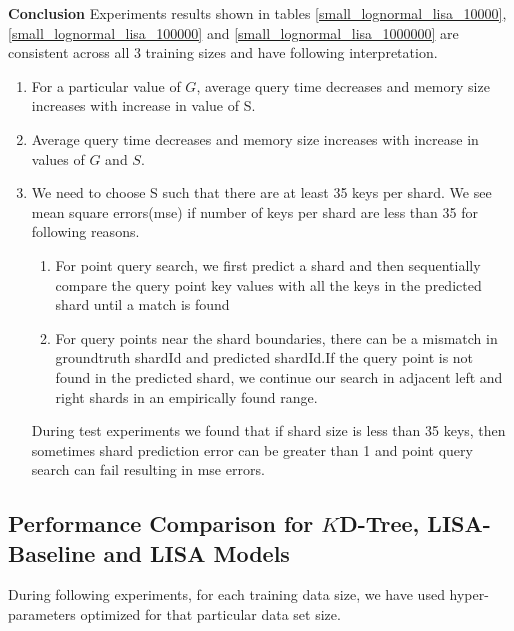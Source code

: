 \textbf{Conclusion} Experiments results shown in tables \ref{small_lognormal_lisa_10000}, \ref{small_lognormal_lisa_100000} and \ref{small_lognormal_lisa_1000000} are consistent across all 3 training sizes and have following interpretation. 
\begin{enumerate}

    \item For a particular value of $G$, average query time decreases and memory size increases with increase in value of S.
    
    \item Average query time decreases and memory size increases with increase in values of $G$ and $S$. 
	
	\item We need to choose S such that there are at least 35 keys per shard. We see mean square errors(mse) if number of keys per shard are less than 35 for following reasons. 
	\begin{enumerate}
	    \item For point query search, we first predict a shard and then sequentially compare the query point key values with all the keys in the predicted shard until a match is found
		\item For query points near the shard boundaries, there can be a mismatch in groundtruth shardId and predicted shardId.If the query point is not found in the predicted shard, we continue our search in adjacent left and right shards in an empirically found range.
	\end{enumerate}
	
	During test experiments we found that if shard size is less than 35 keys, then sometimes shard prediction error can be greater than 1 and point query search can fail resulting in mse errors.  
\end{enumerate}



\subsection{Performance Comparison for $K$D-Tree, LISA-Baseline and LISA Models }
During following experiments, for each training data size, we have used hyper-parameters optimized for that particular data set size. 

